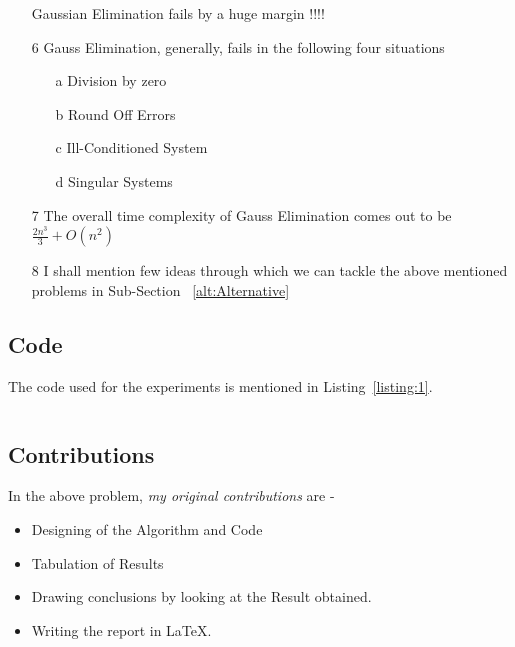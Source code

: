 \documentclass[titlepage, 11pt]{article}
\begin{document}
\begin{itemize}
    Gaussian Elimination fails by a huge margin !!!!
    
    \item [6] Gauss Elimination, generally, fails in the following four situations
    \begin{itemize}
        \item [a] Division by zero
        \item [b] Round Off Errors
        \item [c] Ill-Conditioned System
        \item [d] Singular Systems
    \end{itemize}
    
    \item [7] The overall time complexity of Gauss Elimination comes out to be ${\frac{2n^3}{3} + O(n^2)}$
    \item [8] I shall mention few ideas through which we can tackle the above mentioned problems in Sub-Section ~\ref{alt:Alternative}
\end{itemize}


\subsection{Code}
The code used for the experiments is mentioned in Listing~\ref{listing:1}. 

\inputminted[breaklines,
 mathescape,
 linenos,
 numbersep=5pt,
 frame=single,
 numbersep=5pt,
 xleftmargin=0pt]{c}{A4P1.c}
\label{listing:1}


\subsection{Contributions}
In the above problem, \textit{my original contributions} are - 
\begin{itemize}
    \item Designing of the Algorithm and Code
    \item Tabulation of Results
    \item Drawing conclusions by looking at the Result obtained.
    \item Writing the report in LaTeX. 
\end{itemize}

\end{document}
